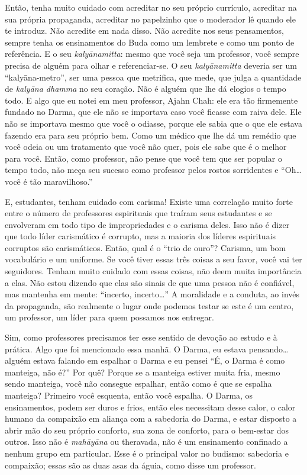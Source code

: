 Então, tenha muito cuidado com acreditar no seu próprio currículo,
acreditar na sua própria propaganda, acreditar no papelzinho que o
moderador lê quando ele te introduz. Não acredite em nada disso. Não
acredite nos seus pensamentos, sempre tenha os ensinamentos do Buda
como um lembrete e como um ponto de referência. E o seu
\textit{kalyānamitta}: mesmo que você seja um professor, você sempre
precisa de alguém para olhar e referenciar-se. O seu
\textit{kalyānamitta} deveria ser um “kalyāna-metro”, ser uma
pessoa que metrifica, que mede, que julga a quantidade de
\textit{kalyāna dhamma} no seu coração. Não é alguém que lhe dá
elogios o tempo todo. E algo que eu notei em meu professor, Ajahn Chah:
ele era tão firmemente fundado no Darma, que ele não se importava caso
você ficasse com raiva dele. Ele não se importava mesmo que você o
odiasse, porque ele sabia que o que ele estava fazendo era para seu
próprio bem. Como um médico que lhe dá um remédio que você odeia ou um
tratamento que você não quer, pois ele sabe que é o melhor para você.
Então, como professor, não pense que você tem que ser popular o tempo
todo, não meça seu sucesso como professor pelos rostos sorridentes e
“Oh… você é tão maravilhoso.” 

E, estudantes, tenham cuidado com carisma! Existe uma correlação
muito forte entre o número de professores espirituais que traíram seus
estudantes e se envolveram em todo tipo de impropriedades e o carisma
deles. Isso não é dizer que todo líder carismático é corrupto, mas a
maioria dos líderes espirituais corruptos são carismáticos. Então, qual
é o “trio de ouro”? Carisma, um bom vocabulário e um uniforme. Se você
tiver essas três coisas a seu favor, você vai ter seguidores. Tenham
muito cuidado com essas coisas, não deem muita importância a elas. Não
estou dizendo que elas são sinais de que uma pessoa não é confiável,
mas mantenha em mente: “incerto, incerto…” A moralidade e a conduta, ao
invés da propaganda, são realmente o lugar onde podemos testar se este
é um centro, um professor, um líder para quem possamos nos entregar. 

Sim, como professores precisamos ter esse sentido de devoção ao
estudo e à prática. Algo que foi mencionado essa manhã. O Darma, eu
estava pensando… alguém estava falando em espalhar o Darma e eu pensei
“É, o Darma é como manteiga, não é?” Por quê? Porque se a manteiga
estiver muita fria, mesmo sendo manteiga, você não consegue espalhar,
então como é que se espalha manteiga? Primeiro você esquenta, então
você espalha. O Darma, os ensinamentos, podem ser duros e frios, então
eles necessitam desse calor, o calor humano da compaixão em aliança com
a sabedoria do Darma, e estar disposto a abrir mão do seu próprio
conforto, sua zona de conforto, para o bem-estar dos outros. Isso não é
\textit{mahāyāna} ou theravada, não é um ensinamento confinado a
nenhum grupo em particular. Esse é o principal valor no budismo:
sabedoria e compaixão; essas são as duas asas da águia, como disse um
professor. 

